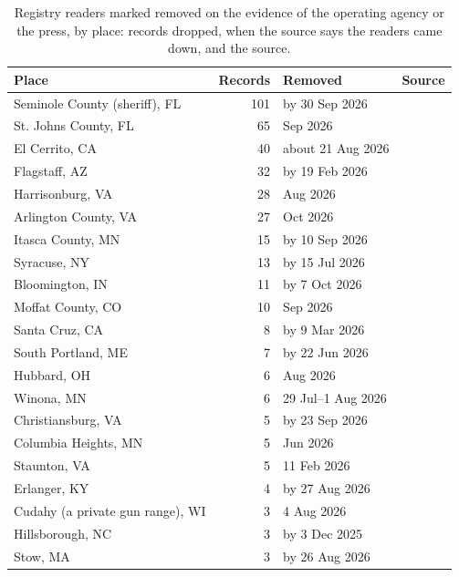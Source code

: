 \documentclass[11pt,twoside]{article}
\begin{document}
\begin{table}[htbp]
\centering
\footnotesize
\caption{Registry readers marked removed on the evidence of the operating agency or the press,
by place: records dropped, when the source says the readers came down, and the source.}
\label{tab:removals}
\begin{tabular}{lrll}
\toprule
Place & Records & Removed & Source \\
\midrule
Seminole County (sheriff), FL & 101 & by 30 Sep 2026 & \citet{rm_seminole_fl} \\
St. Johns County, FL & 65 & Sep 2026 & \citet{rm_stjohns_fl} \\
El Cerrito, CA & 40 & about 21 Aug 2026 & \citet{rm_elcerrito_ca} \\
Flagstaff, AZ & 32 & by 19 Feb 2026 & \citet{rm_flagstaff_az} \\
Harrisonburg, VA & 28 & Aug 2026 & \citet{rm_harrisonburg_va} \\
Arlington County, VA & 27 & Oct 2026 & \citet{rm_arlington_va} \\
Itasca County, MN & 15 & by 10 Sep 2026 & \citet{rm_itasca_mn} \\
Syracuse, NY & 13 & by 15 Jul 2026 & \citet{rm_syracuse_ny} \\
Bloomington, IN & 11 & by 7 Oct 2026 & \citet{rm_bloomington_in} \\
Moffat County, CO & 10 & Sep 2026 & \citet{rm_moffatcounty_co} \\
Santa Cruz, CA & 8 & by 9 Mar 2026 & \citet{rm_santacruz_ca} \\
South Portland, ME & 7 & by 22 Jun 2026 & \citet{rm_southportland_me} \\
Hubbard, OH & 6 & Aug 2026 & \citet{rm_hubbard_oh} \\
Winona, MN & 6 & 29 Jul--1 Aug 2026 & \citet{rm_winona_mn} \\
Christiansburg, VA & 5 & by 23 Sep 2026 & \citet{rm_christiansburg_va} \\
Columbia Heights, MN & 5 & Jun 2026 & \citet{rm_columbiaheights_mn} \\
Staunton, VA & 5 & 11 Feb 2026 & \citet{rm_staunton_va} \\
Erlanger, KY & 4 & by 27 Aug 2026 & \citet{rm_erlanger_ky} \\
Cudahy (a private gun range), WI & 3 & 4 Aug 2026 & \citet{rm_cudahy_wi} \\
Hillsborough, NC & 3 & by 3 Dec 2025 & \citet{rm_hillsborough_nc} \\
Stow, MA & 3 & by 26 Aug 2026 & \citet{rm_stow_ma} \\

\end{tabular}
\end{table}
\end{document}
